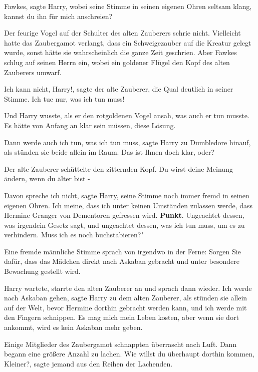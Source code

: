 \glqq{}Fawkes\grqq{}, sagte Harry, wobei seine Stimme in seinen eigenen Ohren
seltsam klang, \glqq{}kannst du ihn für mich anschreien?\grqq{}

Der feurige Vogel auf der Schulter des alten Zauberers schrie nicht. Vielleicht
hatte das Zaubergamot verlangt, dass ein Schweigezauber auf die Kreatur gelegt
wurde, sonst hätte sie wahrscheinlich die ganze Zeit geschrien. Aber Fawkes
schlug auf seinen Herrn ein, wobei ein goldener Flügel den Kopf des alten
Zauberers umwarf.

\glqq{}Ich kann nicht, Harry!\grqq{}, sagte der alte Zauberer, die Qual deutlich
in seiner Stimme. \glqq{}Ich tue nur, was ich tun muss!\grqq{}

Und Harry wusste, als er den rotgoldenen Vogel ansah, was auch er tun musste. Es
hätte von Anfang an klar sein müssen, diese Lösung.

\glqq{}Dann werde auch ich tun, was ich tun muss\grqq{}, sagte Harry zu
Dumbledore hinauf, als stünden sie beide allein im Raum. \glqq{}Das ist Ihnen
doch klar, oder?\grqq{}

Der alte Zauberer schüttelte den zitternden Kopf. \glqq{}Du wirst deine Meinung
ändern, wenn du älter bist -\grqq{}

\glqq{}Davon spreche ich nicht\grqq{}, sagte Harry, seine Stimme noch immer fremd
in seinen eigenen Ohren. \glqq{}Ich meine, dass ich unter keinen Umständen
zulassen werde, dass Hermine Granger von Dementoren gefressen wird.
\textbf{Punkt}. Ungeachtet dessen, was irgendein Gesetz sagt, und ungeachtet
dessen, was ich tun muss, um es zu verhindern. Muss ich es noch buchstabieren?"

Eine fremde männliche Stimme sprach von irgendwo in der Ferne: \glqq{}Sorgen Sie
dafür, dass das Mädchen direkt nach Askaban gebracht und unter besondere
Bewachung gestellt wird.\grqq{}

Harry wartete, starrte den alten Zauberer an und sprach dann wieder. \glqq{}Ich
werde nach Askaban gehen\grqq{}, sagte Harry zu dem alten Zauberer, als stünden
sie allein auf der Welt, \glqq{}bevor Hermine dorthin gebracht werden kann, und
ich werde mit den Fingern schnippen. Es mag mich mein Leben kosten, aber wenn
sie dort ankommt, wird es kein Askaban mehr geben.\grqq{}

Einige Mitglieder des Zaubergamot schnappten überrascht nach Luft. Dann begann
eine größere Anzahl zu lachen. \glqq{}Wie willst du überhaupt dorthin kommen,
Kleiner?\grqq{}, sagte jemand aus den Reihen der Lachenden.

